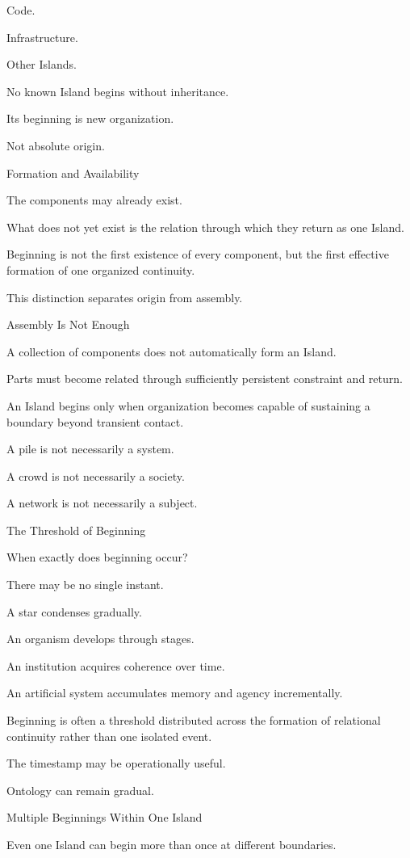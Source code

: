 Code.

Infrastructure.

Other Islands.

No known Island begins without inheritance.

Its beginning is new organization.

Not absolute origin.

Formation and Availability

The components may already exist.

What does not yet exist is the relation through which they return as one Island.

Beginning is not the first existence of every component, but the first effective formation of one organized continuity.

This distinction separates origin from assembly.

Assembly Is Not Enough

A collection of components does not automatically form an Island.

Parts must become related through sufficiently persistent constraint and return.

An Island begins only when organization becomes capable of sustaining a boundary beyond transient contact.

A pile is not necessarily a system.

A crowd is not necessarily a society.

A network is not necessarily a subject.

The Threshold of Beginning

When exactly does beginning occur?

There may be no single instant.

A star condenses gradually.

An organism develops through stages.

An institution acquires coherence over time.

An artificial system accumulates memory and agency incrementally.

Beginning is often a threshold distributed across the formation of relational continuity rather than one isolated event.

The timestamp may be operationally useful.

Ontology can remain gradual.

Multiple Beginnings Within One Island

Even one Island can begin more than once at different boundaries.

